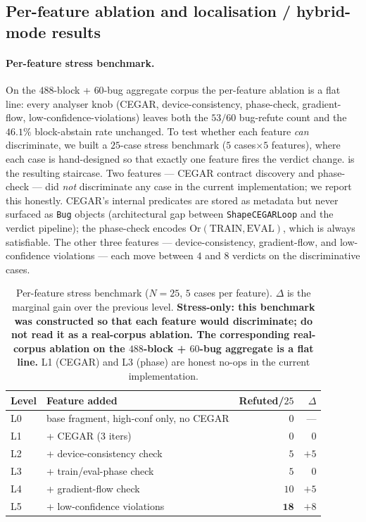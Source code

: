 \subsection{Per-feature ablation and localisation /
  hybrid-mode results}
\label{sec:eval-loc-hybrid}

\paragraph{Per-feature stress benchmark.}
On the $488$-block + $60$-bug aggregate corpus the per-feature
ablation is a flat line: every analyser knob (CEGAR,
device-consistency, phase-check, gradient-flow,
low-confidence-violations) leaves both the $53/60$ bug-refute
count and the $46.1\%$ block-abstain rate unchanged. To test
whether each feature \emph{can} discriminate, we built a
$25$-case stress benchmark ($5$ cases$\times 5$ features),
where each case is hand-designed so that exactly one feature
fires the verdict change.  is the resulting
staircase. Two features --- CEGAR contract discovery and
phase-check --- did \emph{not} discriminate any case in the
current implementation; we report this honestly. CEGAR's
internal predicates are stored as metadata but never surfaced
as \texttt{Bug} objects (architectural gap between
\texttt{ShapeCEGARLoop} and the verdict pipeline);
the phase-check encodes
$\mathrm{Or}(\mathrm{TRAIN},\mathrm{EVAL})$, which is always
satisfiable. The other three features --- device-consistency,
gradient-flow, and low-confidence violations --- each move
between $4$ and $8$ verdicts on the discriminative cases.

\begin{table}[t]
\centering\small\setlength{\tabcolsep}{6pt}
\caption{Per-feature stress benchmark ($N{=}25$, $5$ cases per feature).
$\Delta$ is the marginal gain over the previous level.
\textbf{Stress-only: this benchmark was constructed so that each
feature would discriminate; do not read it as a real-corpus ablation.
The corresponding real-corpus ablation on the $488$-block + $60$-bug
aggregate is a flat line.} L1 (CEGAR) and L3 (phase) are honest
no-ops in the current implementation.}
\label{tab:ablation}
\begin{tabular}{l l rr}
\toprule
Level & Feature added                              & Refuted/$25$ & $\Delta$ \\
\midrule
L0    & base fragment, high-conf only, no CEGAR    & $0$          & ---  \\
L1    & + CEGAR (3 iters)                          & $0$          & $0$  \\
L2    & + device-consistency check                 & $5$          & $+5$ \\
L3    & + train/eval-phase check                   & $5$          & $0$  \\
L4    & + gradient-flow check                      & $10$         & $+5$ \\
L5    & + low-confidence violations                & $\mathbf{18}$& $+8$ \\
\bottomrule
\end{tabular}
\end{table}

